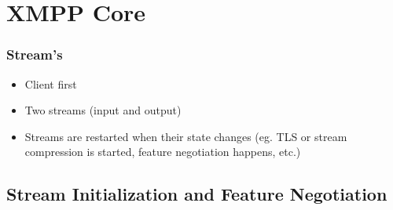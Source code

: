 \documentclass[xelatex]{beamer}
\begin{document}
	\section[]{XMPP Core}
	\frame{\sectionpage}

	\begin{frame}
		\frametitle{Stream's}
		\begin{itemize}
			\item Client first
			\item Two streams (input and output)
			\item Streams are restarted when their state changes (eg. TLS or stream
				compression is started, feature negotiation happens, etc.)
		\end{itemize}
	\end{frame}

	\subsection[]{Stream Initialization and Feature Negotiation}
	\frame{\subsectionpage}
\end{document}
